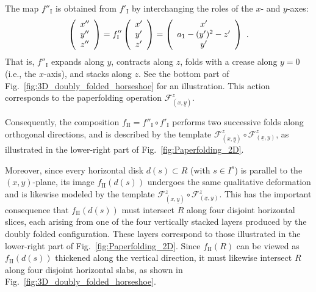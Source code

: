 \documentclass[12pt]{iopart}
\begin{document}
The map \( f''_{\mathrm{I}} \) is obtained from \( f'_{\mathrm{I}} \) by interchanging the roles of the \( x \)- and \( y \)-axes:
\begin{equation}\label{eq:f prime prime I}
\left( \begin{array}{ccc}
x^{\prime\prime}\\
y^{\prime\prime} \\
z^{\prime\prime} \end{array} \right) = 
f^{\prime\prime}_{\rm I} \left( \begin{array}{ccc}
x^{\prime}\\
y^{\prime} \\
z^{\prime} \end{array} \right) =
\left( \begin{array}{ccc}
x^{\prime}\\
a_1 - (y^{\prime})^2 - z^{\prime} \\
y^{\prime} \end{array} \right)\ .
\end{equation}
That is, \( f''_{\mathrm{I}} \) expands along \( y \), contracts along \( z \), folds with a crease along \( y = 0 \) (i.e., the \( x \)-axis), and stacks along \( z \). See the bottom part of Fig.~\ref{fig:3D_doubly_folded_horseshoe} for an illustration. This action corresponds to the paperfolding operation \( \mathcal{F}^z_{(x,\underline{y})} \).

Consequently, the composition \( f_{\mathrm{II}} = f''_{\mathrm{I}} \circ f'_{\mathrm{I}} \) performs two successive folds along orthogonal directions, and is described by the template \( \mathcal{F}^z_{(x,\underline{y})} \circ \mathcal{F}^z_{(\underline{x},y)} \), as illustrated in the lower-right part of Fig.~\ref{fig:Paperfolding_2D}.

Moreover, since every horizontal disk \( d(s) \subset R \) (with \( s \in I^s \)) is parallel to the \( (x,y) \)-plane, its image \( f_{\mathrm{II}}(d(s)) \) undergoes the same qualitative deformation and is likewise modeled by the template \( \mathcal{F}^z_{(x,\underline{y})} \circ \mathcal{F}^z_{(\underline{x},y)} \). This has the important consequence that \( f_{\mathrm{II}}(d(s)) \) must intersect \( R \) along four disjoint horizontal slices, each arising from one of the four vertically stacked layers produced by the doubly folded configuration. These layers correspond to those illustrated in the lower-right part of Fig.~\ref{fig:Paperfolding_2D}. Since \( f_{\mathrm{II}}(R) \) can be viewed as \( f_{\mathrm{II}}(d(s)) \) thickened along the vertical direction, it must likewise intersect \( R \) along four disjoint horizontal slabs, as shown in Fig.~\ref{fig:3D_doubly_folded_horseshoe}.
\end{document}
